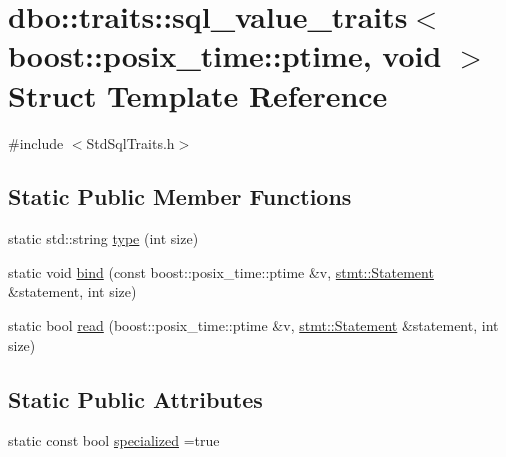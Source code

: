 \hypertarget{structdbo_1_1traits_1_1sql__value__traits_3_01boost_1_1posix__time_1_1ptime_00_01void_01_4}{\section{dbo\+:\+:traits\+:\+:sql\+\_\+value\+\_\+traits$<$ boost\+:\+:posix\+\_\+time\+:\+:ptime, void $>$ Struct Template Reference}
\label{structdbo_1_1traits_1_1sql__value__traits_3_01boost_1_1posix__time_1_1ptime_00_01void_01_4}
}


{\ttfamily \#include $<$Std\+Sql\+Traits.\+h$>$}

\subsection*{Static Public Member Functions}
\begin{DoxyCompactItemize}
\item 
static std\+::string \hyperlink{structdbo_1_1traits_1_1sql__value__traits_3_01boost_1_1posix__time_1_1ptime_00_01void_01_4_a1bab48c18f188045543ff77720c242e5}{type} (int size)
\item 
static void \hyperlink{structdbo_1_1traits_1_1sql__value__traits_3_01boost_1_1posix__time_1_1ptime_00_01void_01_4_aeceddfb671b6532ca602374e71e8b10c}{bind} (const boost\+::posix\+\_\+time\+::ptime \&v, \hyperlink{classdbo_1_1stmt_1_1_statement}{stmt\+::\+Statement} \&statement, int size)
\item 
static bool \hyperlink{structdbo_1_1traits_1_1sql__value__traits_3_01boost_1_1posix__time_1_1ptime_00_01void_01_4_aa8a64c5345216bf35c475621af5db63e}{read} (boost\+::posix\+\_\+time\+::ptime \&v, \hyperlink{classdbo_1_1stmt_1_1_statement}{stmt\+::\+Statement} \&statement, int size)
\end{DoxyCompactItemize}
\subsection*{Static Public Attributes}
\begin{DoxyCompactItemize}
\item 
static const bool \hyperlink{structdbo_1_1traits_1_1sql__value__traits_3_01boost_1_1posix__time_1_1ptime_00_01void_01_4_a61f5c2ec18ba238217f2bd6c7514795f}{specialized} =true
\end{DoxyCompactItemize}


